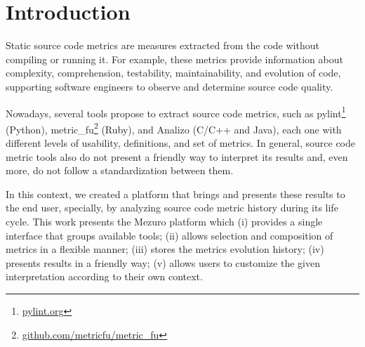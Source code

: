 \section{Introduction}
\label{sec:intro}

Static source code metrics are measures extracted from the code without
compiling or running it. For example, these metrics provide information about %
complexity, comprehension, testability, maintainability, and evolution of code,
supporting software engineers to observe and determine source code
quality\cite{mills1988}.

Nowadays, several tools propose to extract source code metrics, such as
pylint\footnote{\url{pylint.org}} (Python),
metric\_fu\footnote{\url{github.com/metricfu/metric_fu}} (Ruby), and Analizo
(C/C++ and Java)\cite{terceiro2010analizo}, each one with different levels of
usability, definitions, and set of metrics.
%
In general, source code metric tools also do not present a friendly way to
interpret its results and, even more, do not follow a standardization between
them.

In this context, we created a platform that brings and presents these results to %
the end user, specially, by analyzing source code metric history during its
life cycle.
This work presents the Mezuro platform which (i) provides a single interface
that groups available tools; (ii) allows selection and composition of metrics
in a flexible manner; (iii) stores the metrics evolution history; (iv) presents
results in a friendly way; (v) allows users to customize the given
interpretation according to their own context.

